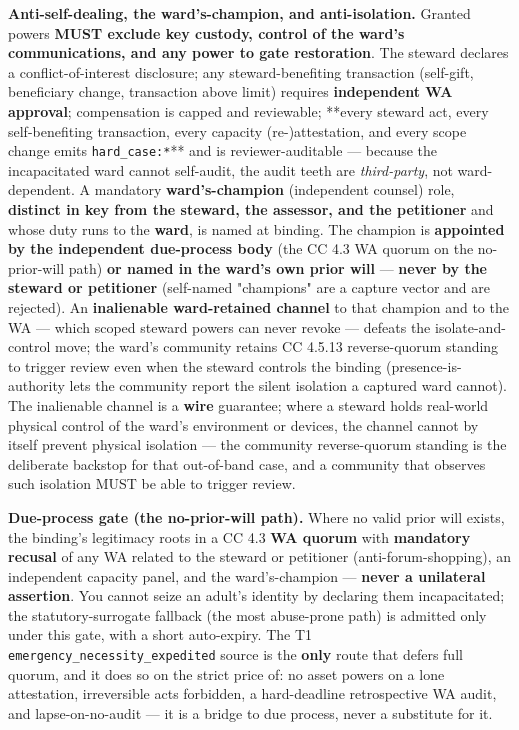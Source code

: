 \documentclass[11pt]{article}
\begin{document}
\textbf{Anti-self-dealing, the ward's-champion, and anti-isolation.} Granted powers \textbf{MUST exclude key custody, control of the ward's communications, and any power to gate restoration}. The steward declares a conflict-of-interest disclosure; any steward-benefiting transaction (self-gift, beneficiary change, transaction above limit) requires \textbf{independent WA approval}; compensation is capped and reviewable; **every steward act, every self-benefiting transaction, every capacity (re-)attestation, and every scope change emits \texttt{hard\_case:*}** and is reviewer-auditable — because the incapacitated ward cannot self-audit, the audit teeth are \textit{third-party}, not ward-dependent. A mandatory \textbf{ward's-champion} (independent counsel) role, \textbf{distinct in key from the steward, the assessor, and the petitioner} and whose duty runs to the \textbf{ward}, is named at binding. The champion is \textbf{appointed by the independent due-process body} (the CC 4.3 WA quorum on the no-prior-will path) \textbf{or named in the ward's own prior will} — \textbf{never by the steward or petitioner} (self-named "champions" are a capture vector and are rejected). An \textbf{inalienable ward-retained channel} to that champion and to the WA — which scoped steward powers can never revoke — defeats the isolate-and-control move; the ward's community retains CC 4.5.13 reverse-quorum standing to trigger review even when the steward controls the binding (presence-is-authority lets the community report the silent isolation a captured ward cannot). The inalienable channel is a \textbf{wire} guarantee; where a steward holds real-world physical control of the ward's environment or devices, the channel cannot by itself prevent physical isolation — the community reverse-quorum standing is the deliberate backstop for that out-of-band case, and a community that observes such isolation MUST be able to trigger review.


\textbf{Due-process gate (the no-prior-will path).} Where no valid prior will exists, the binding's legitimacy roots in a CC 4.3 \textbf{WA quorum} with \textbf{mandatory recusal} of any WA related to the steward or petitioner (anti-forum-shopping), an independent capacity panel, and the ward's-champion — \textbf{never a unilateral assertion}. You cannot seize an adult's identity by declaring them incapacitated; the statutory-surrogate fallback (the most abuse-prone path) is admitted only under this gate, with a short auto-expiry. The T1 \texttt{emergency\_necessity\_expedited} source is the \textbf{only} route that defers full quorum, and it does so on the strict price of: no asset powers on a lone attestation, irreversible acts forbidden, a hard-deadline retrospective WA audit, and lapse-on-no-audit — it is a bridge to due process, never a substitute for it.
\end{document}

